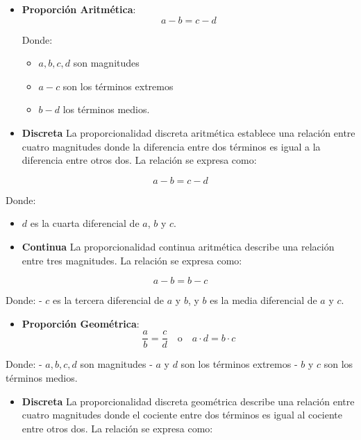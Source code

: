 \documentclass[
  stu,
  floatsintext,
  longtable,
  a4paper,
  nolmodern,
  notxfonts,
  notimes,
  colorlinks=true,linkcolor=blue,citecolor=blue,urlcolor=blue]{apa7}
\providecommand{\tightlist}{%
  \setlength{\itemsep}{0pt}\setlength{\parskip}{0pt}}
\begin{document}
\begin{itemize}
\item
  \textbf{Proporción Aritmética}: \[
  a - b = c - d
  \]

  Donde:

  \begin{itemize}
  \item
    \(a, b, c, d\) son magnitudes
  \item
    \(a-c\) son los términos extremos
  \item
    \(b-d\) los términos medios.
  \end{itemize}
\item
  \textbf{Discreta} La proporcionalidad discreta aritmética establece
  una relación entre cuatro magnitudes donde la diferencia entre dos
  términos es igual a la diferencia entre otros dos. La relación se
  expresa como:
\end{itemize}

\[
a - b = c - d
\]

Donde:

\begin{itemize}
\item
  \(d\) es la cuarta diferencial de \(a\), \(b\) y \(c\).
\item
  \textbf{Continua} La proporcionalidad continua aritmética describe una
  relación entre tres magnitudes. La relación se expresa como:
\end{itemize}

\[
a - b = b - c
\]

Donde: - \(c\) es la tercera diferencial de \(a\) y \(b\), y \(b\) es la
media diferencial de \(a\) y \(c\).

\begin{itemize}
\tightlist
\item
  \textbf{Proporción Geométrica}: \[
  \frac{a}{b} = \frac{c}{d} \quad \text{o} \quad a \cdot d = b \cdot c
  \]
\end{itemize}

Donde: - \(a, b, c, d\) son magnitudes - \(a\) y \(d\) son los términos
extremos - \(b\) y \(c\) son los términos medios.

\begin{itemize}
\tightlist
\item
  \textbf{Discreta} La proporcionalidad discreta geométrica describe una
  relación entre cuatro magnitudes donde el cociente entre dos términos
  es igual al cociente entre otros dos. La relación se expresa como:
\end{itemize}
\end{document}

